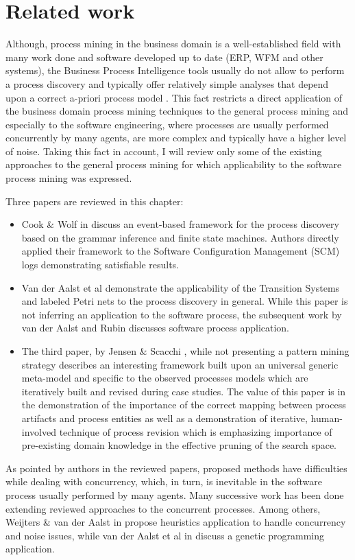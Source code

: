 \chapter{Related work} \label{related.work}
Although, process mining in the business domain is a well-established field with many work done and software developed up to date (ERP, WFM and other systems), the Business Process Intelligence tools usually do not allow to perform a process discovery and typically offer relatively simple analyses that depend upon a correct a-priori process model \cite{citeulike:3718014} \cite{citeulike:5044991}. This fact restricts a direct application of the business domain process mining techniques to the general process mining and especially to the software engineering, where processes are usually performed concurrently by many agents, are more complex and typically have a higher level of noise. Taking this fact in account, I will review only some of the existing approaches to the general process mining for which applicability to the software process mining was expressed. 

Three papers are reviewed in this chapter: 
\begin{itemize}
	\item Cook \& Wolf in \cite{citeulike:328044} discuss an event-based framework for the process discovery based on the grammar inference and finite state machines. Authors directly applied their framework to the Software Configuration Management (SCM) logs demonstrating satisfiable results. 
	\item Van der Aalst et al \cite{citeulike:3718014} demonstrate the applicability of the Transition Systems and labeled Petri nets to the process discovery in general. While this paper is not inferring an application to the software process, the subsequent work by van der Aalst and Rubin \cite{citeulike:1885717} discusses software process application.
	\item The third paper, by Jensen \& Scacchi \cite{citeulike:5043664}, while not presenting a pattern mining strategy describes an interesting framework built upon an universal generic meta-model and specific to the observed processes models which are iteratively built and revised during case studies. The value of this paper is in the demonstration of the importance of the correct mapping between process artifacts and process entities as well as a demonstration of iterative, human-involved technique of process revision which is emphasizing importance of pre-existing domain knowledge in the effective pruning of the search space.
\end{itemize}
As pointed by authors in the reviewed papers, proposed methods have difficulties while dealing with concurrency, which, in turn, is inevitable in the software process usually performed by many agents. Many successive work has been done extending reviewed approaches to the concurrent processes. Among others, Weijters \& van der Aalst in \cite{citeulike:5128101} propose heuristics application to handle concurrency and noise issues, while van der Aalst et al in \cite{citeulike:5128110} discuss a genetic programming application. 

